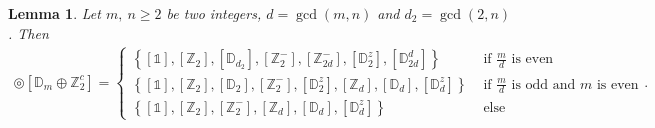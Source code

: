 \documentclass[11pt,a4paper]{amsart}
\newtheorem{lem}[thm]{Lemma}
\theoremstyle{definition}
\newcommand{\ZZ}{\mathbb{Z}}                %
\newcommand{\DD}{\mathbb{D}}                %
\newcommand{\1}{\mathds{1}}		            %
\newcommand{\set}[1]{\left\{#1\right\}}     %
\begin{document}

\begin{lem}\label{lem:D2nhclipsDm}
  Let $m,\ n \geq 2$ be two integers, $d=\gcd(m,n)$ and $d_2=\gcd(2,n)$. Then
  \begin{align*}
    [\DD_{2n}^{d}] \circledcirc [\DD_m \oplus \ZZ_2^c]=
    \begin{cases}
      \set{[\1],[\ZZ_2],[\DD_{d_2}],[\ZZ_2^-],[\ZZ_{2d}^-],[\DD_2^z],[\DD_{2d}^d]}     & \text{ if $\frac{m}{d}$ is even}                \\
      \set{[\1],[\ZZ_2],[\DD_2],[\ZZ_2^-],[\DD_2^z],[\ZZ_d],[\DD_{d}],[\DD_{d}^z]} & \text{ if $\frac{m}{d}$ is odd and $m$ is even} \\
      \set{[\1],[\ZZ_2],[\ZZ_2^-],[\ZZ_d],[\DD_{d}],[\DD_{d}^z]}                   & \text{ else}
    \end{cases}.
  \end{align*}
\end{lem}
\end{document}
